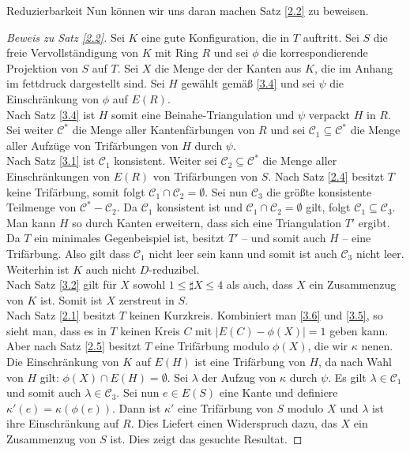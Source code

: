 \begin{section}{Reduzierbarkeit}
 Nun können wir uns daran machen Satz \ref{2.2} zu beweisen.
 \begin{proof}[Beweis zu Satz \ref{2.2}]
  Sei $K$ eine gute Konfiguration, die in $T$ auftritt. Sei $S$ die freie Vervollständigung von $K$ mit Ring $R$ und sei $\phi$ die korrespondierende Projektion von $S$ auf $T$. Sei $X$ die Menge der der Kanten aus $K$, die im Anhang im fettdruck dargestellt sind. Sei $H$ gewählt gemäß \ref{3.4} und sei $\psi$ die Einschränkung von $\phi$ auf $E(R)$.\\
  Nach Satz \ref{3.4} ist $H$ somit eine Beinahe-Triangulation und $\psi$ verpackt $H$ in $R$. Sei weiter $\mathscr{C}^*$ die Menge aller Kantenfärbungen von $R$ und sei $\mathscr{C}_1 \subseteq \mathscr{C}^*$ die Menge aller Aufzüge von Trifärbungen von $H$ durch $\psi$.\\
  Nach Satz \ref{3.1} ist $\mathscr{C}_1$ konsistent. Weiter sei $\mathscr{C}_2 \subseteq \mathscr{C}^*$ die Menge aller Einschränkungen von $E(R)$ von Trifärbungen von $S$. Nach Satz \ref{2.4} besitzt $T$ keine Trifärbung, somit folgt $\mathscr{C}_1 \cap \mathscr{C}_2 = \emptyset$. Sei nun $\mathscr{C}_3$ die größte konsistente Teilmenge von $\mathscr{C}^* - \mathscr{C}_2$. Da $\mathscr{C}_1$ konsistent ist und $\mathscr{C}_1 \cap \mathscr{C}_2 = \emptyset$ gilt, folgt $\mathscr{C}_1 \subseteq \mathscr{C}_3$.\\
  Man kann $H$ so durch Kanten erweitern, dass sich eine Triangulation $T'$ ergibt. Da $T$ ein minimales Gegenbeispiel ist, besitzt $T'$ -- und somit auch $H$ -- eine Trifärbung. Also gilt dass $\mathscr{C}_1$ nicht leer sein kann und somit ist auch $\mathscr{C}_3$ nicht leer. Weiterhin ist $K$ auch nicht $D$-reduzibel.\\
  Nach Satz \ref{3.2} gilt für $X$ sowohl $1 \leq \sharp X \leq 4$ als auch, dass $X$ ein Zusammenzug von $K$ ist. Somit ist $X$ zerstreut in $S$. \\
  Nach Satz \ref{2.1} besitzt $T$ keinen Kurzkreis. Kombiniert man \ref{3.6} und \ref{3.5}, so sieht man, dass es in $T$ keinen Kreis $C$ mit $|E(C) - \phi(X)| = 1$ geben kann. Aber nach Satz \ref{2.5} besitzt $T$ eine Trifärbung modulo $\phi(X)$, die wir $\kappa$ nenen. Die Einschränkung von $K$ auf $E(H)$ ist eine Trifärbung von $H$, da nach Wahl von $H$ gilt: $\phi(X) \cap E(H) = \emptyset$. Sei $\lambda$ der Aufzug von $\kappa$ durch $\psi$. Es gilt $\lambda \in \mathscr{C}_1$ und somit auch  $\lambda \in \mathscr{C}_3$. Sei nun $e \in E(S)$ eine Kante und definiere $\kappa'(e) = \kappa(\phi(e))$. Dann ist $\kappa'$ eine Trifärbung von $S$ modulo $X$ und $\lambda$ ist ihre Einschränkung auf $R$. Dies Liefert einen Widerspruch dazu, das $X$ ein Zusammenzug von $S$ ist. Dies zeigt das gesuchte Resultat.
 \end{proof}

\end{section}